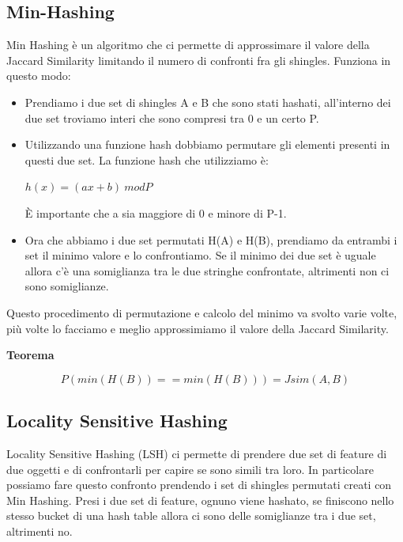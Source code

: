 \documentclass[14pt]{extreport}
\begin{document}
\subsection{Min-Hashing}

Min Hashing è un algoritmo che ci permette di approssimare il valore della Jaccard Similarity limitando il numero di confronti fra gli shingles.
Funziona in questo modo:

\begin{itemize}
    \item Prendiamo i due set di shingles A e B che sono stati hashati, all'interno dei due set troviamo interi che sono compresi tra 0 e un certo P. 
    \item Utilizzando una funzione hash dobbiamo permutare gli elementi presenti in questi due set. La funzione hash che utilizziamo è:  

    \newline
    \centerline{${h(x) = (ax + b) \ mod P}$}
    È importante che a sia maggiore di 0 e minore di P-1.
    \item Ora che abbiamo i due set permutati H(A) e H(B), prendiamo da entrambi i set il minimo valore e lo confrontiamo.
    Se il minimo dei due set è uguale allora c'è una somiglianza tra le due stringhe confrontate, altrimenti non ci sono somiglianze.
\end{itemize}

Questo procedimento di permutazione e calcolo del minimo va svolto varie volte, più volte lo facciamo e meglio approssimiamo il valore della Jaccard Similarity.
\newline

{\bf Teorema}

\begin{equation}
    P(min(H(B)) == min(H(B))) = Jsim(A,B)
\end{equation}

\subsection{Locality Sensitive Hashing}

Locality Sensitive Hashing (LSH) ci permette di prendere due set di feature di due oggetti e di confrontarli per capire se sono simili tra loro.
In particolare possiamo fare questo confronto prendendo i set di shingles permutati creati con Min Hashing.
Presi i due set di feature, ognuno viene hashato, se finiscono nello stesso bucket di una hash table allora ci sono delle somiglianze tra i due set, altrimenti no.
\end{document}
